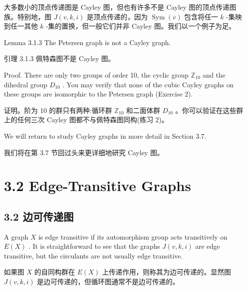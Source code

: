 \documentclass[10pt]{article}
\begin{document}
\begin{tcolorbox}\relax
大多数小的顶点传递图是 Cayley 图，但也有许多不是 Cayley 图的顶点传递图族。特别地，图 \(J\left( {v,k,i}\right)\) 是顶点传递的，因为 \(\operatorname{Sym}\left( v\right)\) 包含将任一 \(k\) -集映到任一其他 \(k\) -集的置换，但一般它们并非 Cayley 图。我们以一个例子为足。
\end{tcolorbox}

Lemma 3.1.3 The Petersen graph is not a Cayley graph.

\begin{tcolorbox}\relax
引理 3.1.3 佩特森图不是 Cayley 图。
\end{tcolorbox}

Proof. There are only two groups of order 10, the cyclic group \({\mathbb{Z}}_{10}\) and the dihedral group \({D}_{10}\) . You may verify that none of the cubic Cayley graphs on these groups are isomorphic to the Petersen graph (Exercise 2).

\begin{tcolorbox}\relax
证明。阶为 10 的群只有两种:循环群 \({\mathbb{Z}}_{10}\) 和二面体群 \({D}_{10}\) 。你可以验证在这些群上的任何三次 Cayley 图都不与佩特森图同构(练习 2)。
\end{tcolorbox}

We will return to study Cayley graphs in more detail in Section 3.7.

\begin{tcolorbox}\relax
我们将在第 3.7 节回过头来更详细地研究 Cayley 图。
\end{tcolorbox}

\section*{3.2 Edge-Transitive Graphs}

\begin{tcolorbox}\relax
\section*{3.2 边可传递图}
\end{tcolorbox}

A graph \(X\) is edge transitive if its automorphism group acts transitively on \(E\left( X\right)\) . It is straightforward to see that the graphs \(J\left( {v,k,i}\right)\) are edge transitive, but the circulants are not usually edge transitive.

\begin{tcolorbox}\relax
如果图 \(X\) 的自同构群在 \(E\left( X\right)\) 上传递作用，则称其为边可传递的。显然图 \(J\left( {v,k,i}\right)\) 是边可传递的，但循环图通常不是边可传递的。
\end{tcolorbox}
\end{document}
